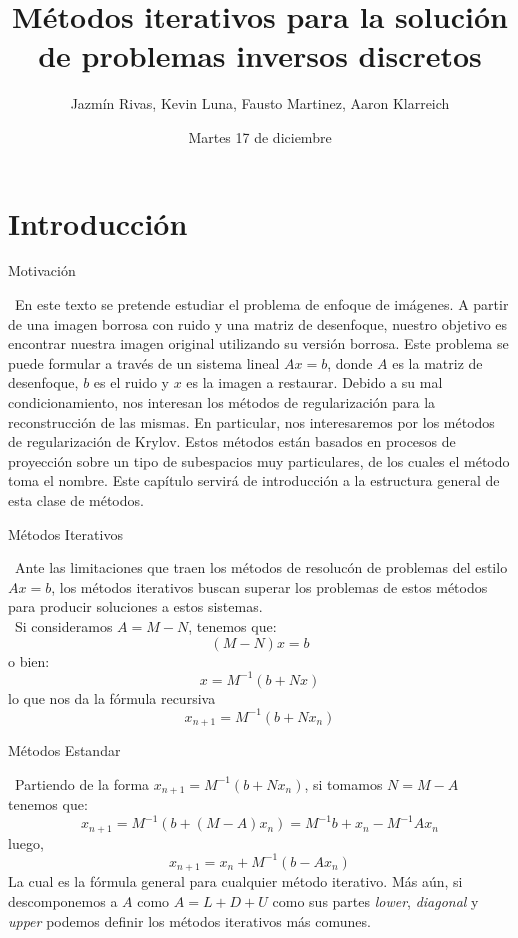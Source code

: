 \documentclass[12pt]{beamer}
\title{Métodos iterativos para la solución de problemas inversos discretos}
\author{Jazmín Rivas, Kevin Luna, Fausto Martinez, Aaron Klarreich}
\date{Martes 17 de diciembre}
\begin{document}
	
	\begin{frame}
		\titlepage
	\end{frame}
	
	\section{Introducción} 
	
	\begin{frame}{Motivación}
		
		\ En este texto se pretende estudiar el problema de enfoque de imágenes. A partir de una imagen borrosa con ruido y una matriz de desenfoque, nuestro objetivo es encontrar nuestra imagen original utilizando su versión borrosa. Este problema se puede formular a través de un sistema lineal $Ax = b$, donde $A$ es la matriz de desenfoque, $b$ es el ruido y $x$ es la imagen a restaurar. Debido a su mal condicionamiento, nos interesan los métodos de regularización para la reconstrucción de las mismas. En particular, nos interesaremos por los métodos de regularización de Krylov. Estos métodos están basados en procesos de proyección sobre un tipo de subespacios muy particulares, de los cuales el método toma el nombre. Este capítulo servirá de introducción a la estructura general de esta clase de métodos.
		
	\end{frame}
	
	\begin{frame}{Métodos Iterativos}
		
		\ Ante las limitaciones que traen los métodos de resolucón de problemas del estilo $Ax = b$, los métodos iterativos buscan superar los problemas de estos métodos para producir soluciones a estos sistemas. \\
		\ Si consideramos $A = M-N$, tenemos que: $$(M-N)x = b$$ o bien: $$x = M^{-1}(b+Nx)$$ lo que nos da la fórmula recursiva $$x_{n+1} = M^{-1}(b+Nx_n)$$
		
	\end{frame}
	
	\begin{frame}{Métodos Estandar}
		
		\ Partiendo de la forma $x_{n+1} = M^{-1}(b+Nx_n)$, si tomamos $N = M-A$ tenemos que: $$x_{n+1}=M^{-1}(b+(M-A)x_{n})=M^{-1}b+x_n-M^{-1}Ax_n$$ luego, $$x_{n+1}=x_n+M^{-1}(b-Ax_n)$$ La cual es la fórmula general para cualquier método iterativo. Más aún, si descomponemos a $A$ como $A = L+D+U$ como sus partes \textit{lower}, \textit{diagonal} y \textit{upper} podemos definir los métodos iterativos más comunes.
		
	\end{frame}
	
\end{document}
